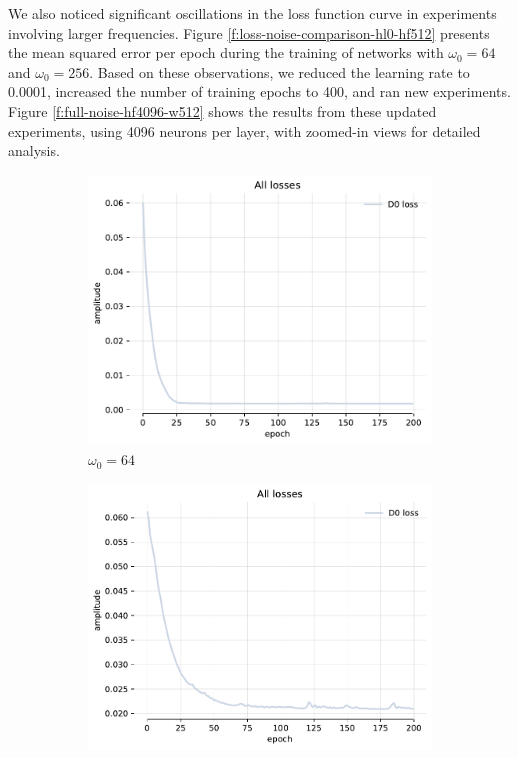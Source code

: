 We also noticed significant oscillations in the loss function curve in experiments involving larger frequencies. Figure \ref{f:loss-noise-comparison-hl0-hf512} presents the mean squared error per epoch during the training of networks with $\omega_0=64$ and $\omega_0=256$. Based on these observations, we reduced the learning rate to 0.0001, increased the number of training epochs to 400, and ran new experiments. Figure \ref{f:full-noise-hf4096-w512} shows the results from these updated experiments, using 4096 neurons per layer, with zoomed-in views for detailed analysis.

\begin{figure}[h]
    \centering
    \begin{subfigure}[b]{0.45\textwidth}
        \centering
        \includegraphics[width=\textwidth]{img/ch3/loss-noise-hl0-hf512-w64.pdf}
        \caption{$\omega_0=64$}
        \label{fig:loss-hf512-w64}
    \end{subfigure}
    \begin{subfigure}[b]{0.45\textwidth}
        \centering
        \includegraphics[width=\textwidth]{img/ch3/loss-noise-hl0-hf512-w256.pdf}

\end{subfigure}
\end{figure}
